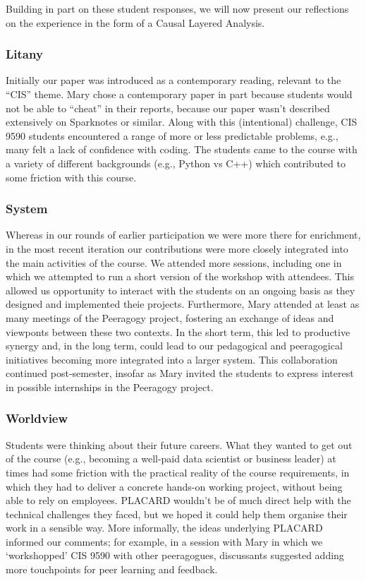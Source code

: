 \documentclass[acmlarge,timestamp]{acmart}
\begin{document}
Building in part on these student responses, we will now present our
reflections on the experience in the form of a Causal Layered
Analysis.

\subsubsection{Litany} Initially our paper was introduced as a contemporary reading, relevant to the “CIS” theme.  Mary chose a contemporary paper in part because students would not be able to “cheat” in their reports, because our paper wasn’t described extensively on Sparknotes or similar.  Along with this (intentional) challenge, CIS 9590 students encountered a range of more or less predictable problems, e.g., many felt a lack of confidence with coding.  The students came to the course with a variety of different backgrounds (e.g., Python vs C++) which contributed to some friction with this course.
\subsubsection{System} Whereas in our rounds of earlier participation we were more there for enrichment, in the most recent iteration our contributions were more { closely} integrated into the { main activities of the course}. We attended more sessions, including one in which we attempted to run a short version of the workshop with attendees.  {  This allowed us opportunity to interact with the students on an ongoing basis as they designed and implemented theie projects.}  Furthermore, Mary attended at least as many meetings of the Peeragogy project, { fostering an exchange of ideas and viewponts} {  between} these two contexts. { In the short term, this led to productive synergy and, in the long term, could lead to our pedagogical and peeragogical initiatives} becoming more integrated into a larger system. This { collaboration} continued post-semester, insofar as Mary invited the students to express interest in possible internships in the Peeragogy project.
\subsubsection{Worldview}  Students were thinking about their future careers.  What they wanted to get out of the course (e.g., becoming a well-paid data scientist or business leader) at times had some friction with the practical reality of the course requirements, in which they had to deliver a concrete hands-on working project, without being able to rely on employees.  PLACARD wouldn’t be of much direct help with the technical challenges they faced, but we hoped it could help them organise their work in a sensible way.  More informally, the ideas underlying PLACARD informed our comments; for example, in a session with Mary in which we ‘workshopped’ CIS 9590 with other peeragogues, discussants suggested adding more touchpoints for peer learning and feedback.
\end{document}
